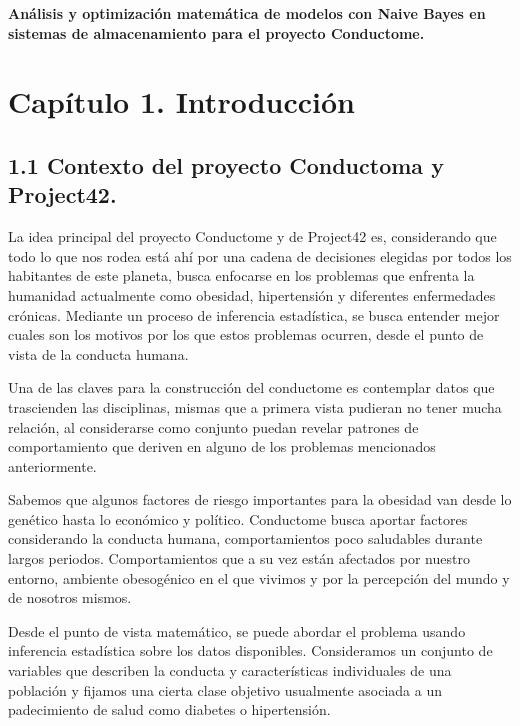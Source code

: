 \documentclass[
 12pt,
 letterpaper,
]{article}
\author{}
\date{}
\theoremstyle{teoremaBreak}
\theoremstyle{plain}
\theoremstyle{definition}
\begin{document}
\textbf{Análisis y optimización matemática de modelos con Naive Bayes en
sistemas de almacenamiento para el proyecto Conductome.}

\renewcommand{\contentsname}{Índice}
\tableofcontents
\newpage

\section{Capítulo 1. Introducción}\label{capítulo-1.1-introducción}

\subsection{\texorpdfstring{1.1 Contexto del proyecto Conductoma y
Project42.}{1 Contexto del proyecto Conductoma y Project42.}}\label{contexto-del-proyecto-conductoma-y-project42.}

La idea principal del proyecto Conductome y de Project42 es,
considerando que todo lo que nos rodea está ahí por una cadena de
decisiones elegidas por todos los habitantes de este planeta, busca
enfocarse en los problemas que enfrenta la humanidad actualmente como
obesidad, hipertensión y diferentes enfermedades crónicas. Mediante un
proceso de inferencia estadística, se busca entender mejor cuales son
los motivos por los que estos problemas ocurren, desde el punto de vista
de la conducta humana.

Una de las claves para la construcción del conductome es contemplar
datos que trascienden las disciplinas, mismas que a primera vista
pudieran no tener mucha relación, al considerarse como conjunto puedan
revelar patrones de comportamiento que deriven en alguno de los
problemas mencionados anteriormente.

Sabemos que algunos factores de riesgo importantes para la obesidad van
desde lo genético hasta lo económico y político. Conductome busca
aportar factores considerando la conducta humana, comportamientos poco
saludables durante largos periodos. Comportamientos que a su vez están
afectados por nuestro entorno, ambiente obesogénico en el que vivimos y
por la percepción del mundo y de nosotros mismos.

Desde el punto de vista matemático, se puede abordar el problema usando
inferencia estadística sobre los datos disponibles. Consideramos un
conjunto de variables que describen la conducta y características
individuales de una población y fijamos una cierta clase objetivo
usualmente asociada a un padecimiento de salud como diabetes o
hipertensión.
\end{document}
